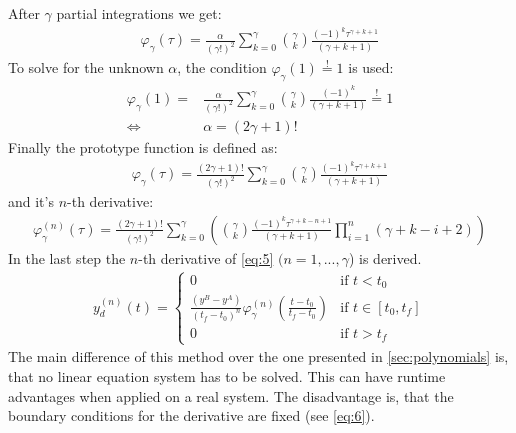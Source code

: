 \documentclass[a4paper,11pt,headings=standardclasses,parskip=half]{scrartcl}
\begin{document}
After $\gamma$ partial integrations we get:
\begin{align*}
\varphi_\gamma(\tau)= \frac{\alpha}{(\gamma!)^2} \sum_{k=0}^{\gamma} \binom{\gamma}{k} \frac{(-1)^k\tau^{\gamma+k+1}}{(\gamma+k+1)}
\end{align*}
To solve for the unknown $\alpha$, the  condition $\varphi_\gamma(1)\overset{!}{=}1$ is used:
\begin{align*}
\varphi_\gamma(1)= &\frac{\alpha}{(\gamma!)^2} \sum_{k=0}^{\gamma} \binom{\gamma}{k} \frac{(-1)^k}{(\gamma+k+1)} \overset{!}{=} 1 \\
\Leftrightarrow \quad & \alpha = (2\gamma+1)!
\end{align*}
Finally the prototype function is defined as:
\begin{align}
\varphi_\gamma(\tau)= \frac{(2\gamma+1)!}{(\gamma!)^2} \sum_{k=0}^{\gamma} \binom{\gamma}{k} \frac{(-1)^k\tau^{\gamma+k+1}}{(\gamma+k+1)}
\end{align}
and it's $n$-th derivative:
\begin{align}
\varphi_\gamma^{(n)}(\tau)= \frac{(2\gamma+1)!}{(\gamma!)^2} \sum_{k=0}^{\gamma} \left(\binom{\gamma}{k} \frac{(-1)^k\tau^{\gamma+k-n+1}}{(\gamma+k+1)}\prod_{i=1}^n(\gamma+k-i+2)\right)
\end{align}
In the last step the $n$-th derivative of \eqref{eq:5} $(n=1,...,\gamma$) is derived.
\begin{align}
y_d^{(n)}(t) = \begin{cases} 0 & \textrm{if } t<t_0 \\ 
\frac{(y^B-y^A)}{(t_f-t_0)^n}\varphi_\gamma^{(n)}\left(\frac{t-t_0}{t_f-t_0}\right) &\textrm{if } t \in [t_0, t_f] \\ 
0&\textrm{if } t>t_f\end{cases}
\end{align}
The main difference of this method over the one presented in \ref{sec:polynomials} is, that no linear equation system has to be solved. This can have runtime advantages when applied on a real system. The disadvantage is, that the boundary conditions for the derivative are fixed (see \eqref{eq:6}).
\end{document}
